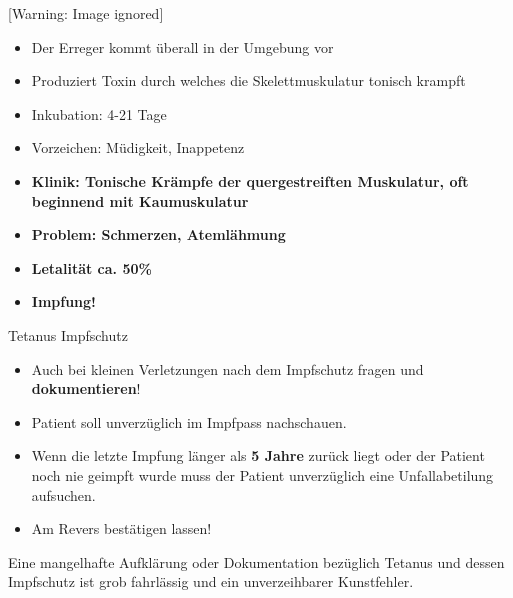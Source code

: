 \documentclass{article}
\newcommand\gEs[1]{\textbf{\textcolor[rgb]{0.0,0.0,0.5019608}{#1}}}
\newcommand\gEs[1]{\textbf{\textcolor[rgb]{0.0,0.0,0.5019608}{#1}}}
\newcommand\gZ[1]{\textcolor[rgb]{0.5019608,0.5019608,0.5019608}{#1}}
\begin{document}
\begin{center}
 [Warning: Image ignored] %

\end{center}
\begin{itemize}
\item {\mdseries
Der Erreger kommt \"uberall in der Umgebung vor}

\item {\mdseries
Produziert Toxin durch welches die Skelettmuskulatur tonisch krampft}

\item {\mdseries
\gZ{Inkubation: 4-21 Tage}}

\item {\mdseries
\gZ{Vorzeichen: M\"udigkeit, Inappetenz}}

\item {\mdseries
\gEs{Klinik: Tonische Kr\"ampfe der quergestreiften
Muskulatur, oft beginnend mit Kaumuskulatur}}

\item {\mdseries
\gEs{Problem: Schmerzen, Ateml\"ahmung}}

\item {\mdseries
\gEs{Letalit\"at ca. 50\%}}

\item {\mdseries
\gEs{Impfung!}}

\end{itemize}
{\mdseries\color{black}
Tetanus Impfschutz}

\begin{itemize}
\item {\mdseries
Auch bei kleinen Verletzungen nach dem Impfschutz fragen und
\gEs{dokumentieren}!}

\item {\mdseries
Patient soll unverz\"uglich im Impfpass nachschauen.}

\item {\mdseries
Wenn die letzte Impfung l\"anger als \gEs{5 Jahre}
zur\"uck liegt oder der Patient noch nie geimpft wurde muss der Patient
unverz\"uglich eine Unfallabetilung aufsuchen. }

\item {\mdseries
Am Revers best\"atigen lassen!}

\end{itemize}
{\mdseries\color{black}
Eine mangelhafte Aufkl\"arung oder Dokumentation bez\"uglich Tetanus und
dessen Impfschutz ist grob fahrl\"assig und ein unverzeihbarer
Kunstfehler.}
\end{document}
